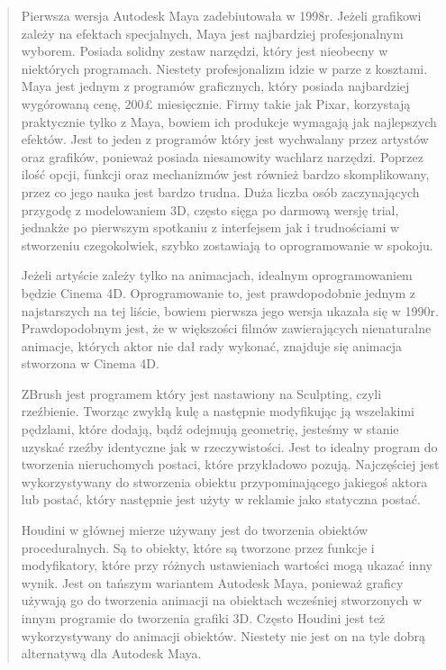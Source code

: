 \begin{quotation}
\indent Pierwsza wersja Autodesk Maya zadebiutowała w 1998r. Jeżeli grafikowi zależy na efektach specjalnych, Maya jest najbardziej profesjonalnym wyborem. Posiada solidny zestaw narzędzi, który jest nieobecny w niektórych programach. Niestety profesjonalizm idzie w parze z kosztami. Maya jest jednym z programów graficznych, który posiada najbardziej wygórowaną cenę, 200£ miesięcznie. Firmy takie jak Pixar, korzystają praktycznie tylko z Maya, bowiem ich produkcje wymagają jak najlepszych efektów. Jest to jeden z programów który jest wychwalany przez artystów oraz grafików, ponieważ posiada niesamowity wachlarz narzędzi. Poprzez ilość opcji, funkcji oraz mechanizmów jest również bardzo skomplikowany, przez co jego nauka jest bardzo trudna. Duża liczba osób zaczynających przygodę z modelowaniem 3D, często sięga po darmową wersję trial, jednakże po pierwszym spotkaniu z interfejsem jak i trudnościami w stworzeniu czegokolwiek, szybko zostawiają to oprogramowanie w spokoju.

\newpage
\indent Jeżeli artyście zależy tylko na animacjach, idealnym oprogramowaniem będzie Cinema 4D. Oprogramowanie to, jest prawdopodobnie jednym z najstarszych na tej liście, bowiem pierwsza jego wersja ukazała się w 1990r. Prawdopodobnym jest, że w większości filmów zawierających nienaturalne animacje, których aktor nie dał rady wykonać, znajduje się animacja stworzona w Cinema 4D. 

\indent ZBrush jest programem który jest nastawiony na Sculpting, czyli rzeźbienie. Tworząc zwykłą kulę a następnie modyfikując ją wszelakimi pędzlami, które dodają, bądź odejmują geometrię, jesteśmy w stanie uzyskać rzeźby identyczne jak w rzeczywistości. Jest to idealny program do tworzenia nieruchomych postaci, które przykładowo pozują. Najczęściej jest wykorzystywany do stworzenia obiektu przypominającego jakiegoś aktora lub postać, który następnie jest użyty w reklamie jako statyczna postać. 

\indent Houdini w głównej mierze używany jest do tworzenia obiektów proceduralnych. Są to obiekty, które są tworzone przez funkcje i modyfikatory, które przy różnych ustawieniach wartości mogą ukazać inny wynik. Jest on tańszym wariantem Autodesk Maya, ponieważ graficy używają go do tworzenia animacji na obiektach wcześniej stworzonych w innym programie do tworzenia grafiki 3D. Często Houdini jest też wykorzystywany do animacji obiektów. Niestety nie jest on na tyle dobrą alternatywą dla Autodesk Maya.


\end{quotation}
